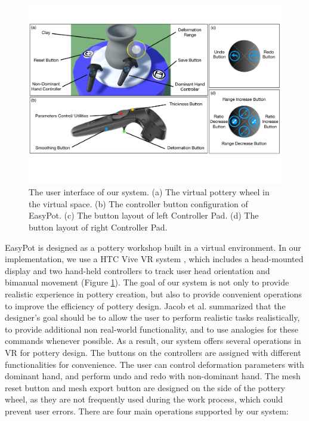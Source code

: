 \documentclass{svjour3}                     %
\begin{document}
\begin{figure}
\includegraphics[width=\textwidth]{fig9}
\caption{The user interface of our system. (a) The virtual pottery wheel in the virtual space. (b) The controller button configuration of EasyPot. (c) The button layout of left Controller Pad. (d) The button layout of right Controller Pad.}
\label{fig:ui}
\end{figure}

EasyPot is designed as a pottery workshop built in a virtual environment. In our implementation, we use a HTC Vive VR system \cite{website:vive}, which includes a head-mounted display and two hand-held controllers to track user head orientation and bimanual movement (Figure \ref{fig:ui}).
The goal of our system is not only to provide realistic experience in pottery creation, but also to provide convenient operations to improve the efficiency of pottery design. 
Jacob et al. \cite{Jacob2008Reality} summarized that the designer's goal should be to allow the user to perform realistic tasks realistically, to provide additional non real-world functionality, and to use analogies for these commands whenever possible.
As a result, our system offers several operations in VR for pottery design.
The buttons on the controllers are assigned with different functionalities for convenience. The user can control deformation parameters with dominant hand, and perform undo and redo with non-dominant hand.
The mesh reset button and mesh export button are designed on the side of the pottery wheel, as they are not frequently used during the work process, which could prevent user errors.
There are four main operations supported by our system:
\end{document}
